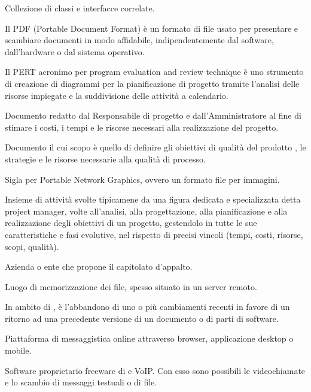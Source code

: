 Collezione di classi e interfacce correlate.

Il PDF (Portable Document Format) è un formato di file usato per presentare e scambiare documenti in modo affidabile, indipendentemente dal software, dall'hardware o dal sistema operativo.

Il PERT acronimo per program evaluation and review technique è uno strumento di creazione di diagrammi per la pianificazione di progetto tramite l’analisi delle risorse impiegate e la suddivisione delle attività a calendario.

Documento redatto dal Responsabile di progetto e dall’Amministratore al fine di stimare i costi, i tempi e le risorse necessari alla realizzazione del progetto.

Documento il cui scopo è quello di definire gli obiettivi di qualità del prodotto , le strategie e le risorse necessarie alla qualità di processo.

Sigla per Portable Network Graphics, ovvero un formato file per immagini.

Insieme di attività svolte tipicamene da una figura dedicata e specializzata detta project manager, volte all'analisi, alla progettazione, alla pianificazione e alla realizzazione degli obiettivi di un progetto, gestendolo in tutte le sue caratteristiche e fasi evolutive, nel rispetto di precisi vincoli (tempi, costi, risorse, scopi, qualità).

Azienda o ente che propone il capitolato d’appalto.
\clearpage

Luogo di memorizzazione dei file, spesso situato in un server remoto.

In ambito di , è l'abbandono di uno o più cambiamenti recenti in favore di un ritorno ad una precedente versione di un documento o di parti di software.

Piattaforma di messaggistica online attraverso browser, applicazione desktop o mobile.
\clearpage

Software proprietario freeware di  e VoIP. Con esso sono possibili le videochiamate e lo scambio di messaggi testuali o di file.

